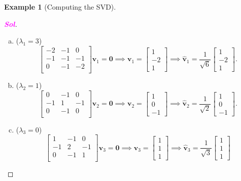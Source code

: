 \documentclass[12pt,openany]{book}
\theoremstyle{definition}
\newtheorem{example}{Example}[chapter]
\newcommand{\sol}{\textcolor{magenta}{\bf Sol}}
\renewcommand{\vec}[1]{\textbf{#1}}
\begin{document}
\begin{example}[Computing the SVD]
\begin{proof}[\sol]
\begin{enumerate}[(Step 1)]
\begin{enumerate}[(i)]
					\begin{enumerate}[(a)]
						\item ($\lambda_1=3$) \[
						\begin{bmatrix}
							-2& -1 &0\\
							-1& -1 &-1\\
							0& -1 &-2\\
						\end{bmatrix}\vec{v}_1=\vec{0}\implies\vec{v}_1=\begin{bmatrix}
						1\\-2\\1
					\end{bmatrix}\implies\hat{\vec{v}}_1=\frac{1}{\sqrt{6}}\begin{bmatrix}
					1\\-2\\1
				\end{bmatrix}.
						\]
						\item ($\lambda_2=1$) \[
						\begin{bmatrix}
							0& -1 &0\\
							-1& 1 &-1\\
							0& -1 &0\\
						\end{bmatrix}\vec{v}_2=\vec{0}\implies\vec{v}_2=\begin{bmatrix}
							1\\0\\-1
						\end{bmatrix}\implies\hat{\vec{v}}_2=\frac{1}{\sqrt{2}}\begin{bmatrix}
							1\\0\\-1
						\end{bmatrix}.
						\]
						\item ($\lambda_3=0$) \[
						\begin{bmatrix}
							1& -1 &0\\
							-1& 2 &-1\\
							0& -1 &1\\
						\end{bmatrix}\vec{v}_3=\vec{0}\implies\vec{v}_3=\begin{bmatrix}
							1\\1\\1
						\end{bmatrix}\implies\hat{\vec{v}}_3=\frac{1}{\sqrt{3}}\begin{bmatrix}
							1\\1\\1

\end{bmatrix}\]
\end{enumerate}
\end{enumerate}
\end{enumerate}
\end{proof}
\end{example}
\end{document}

